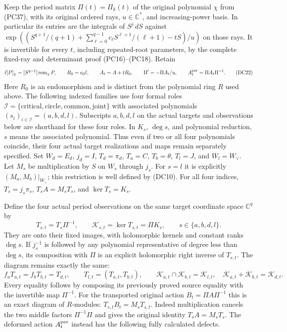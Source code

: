 \documentclass{article}
\begin{document}
Keep the period matrix $\Pi(t)=\Pi_k(t)$ of the original polynomial
$\chi$ from (PC37), with its original ordered rays, $u\in\mathbb C^*$,
and increasing-power basis.  In particular its entries are the
integrals of $S^j\,dS$ against
$\exp((S^{q+1}/(q+1)+\sum_{\ell=0}^{q-1}c_\ell
S^{\ell+1}/(\ell+1)-tS)/u)$ on those rays.  It is invertible for
every $t$, including repeated-root parameters, by the complete
fixed-ray and determinant proof (PC16)--(PC18).  Retain
\[
 \ell[P]_\chi=[S^{q-1}]\operatorname{rem}_\chi P,\qquad
 R_0=e_0\ell,\qquad
 A_t=A+tR_0,\qquad
 \Pi'=-\Pi A_t/u,\qquad
 A_t^{\rm per}=\Pi A_t\Pi^{-1}.
 \tag{DC22}
\]
Here $R_0$ is an endomorphism and is distinct from the polynomial
ring $R$ used above.
The following indexed families use four formal roles
$\mathcal I=\{\mathrm{critical},\mathrm{circle},
\mathrm{common},\mathrm{joint}\}$ with associated polynomials
$(s_i)_{i\in\mathcal I}=(a,b,d,l)$.
Subscripts $a,b,d,l$ on the actual targets and observations below
are shorthand for these four roles.  In $K_s$, $\deg s$,
and polynomial reduction, $s$ means the associated polynomial.
Thus even if two or all four polynomials coincide, their four
actual target realizations and maps remain separately specified.
Set $W_d=E_d$, $j_d=I$, $T_d=\pi_d$, $T_a=C$,
$T_b=\theta$, $T_l=J$, and $W_l=W_\vee$.
Let $M_s$ be multiplication by $S$ on $W_s$ through $j_s$.
For $s=l$ it is explicitly $(M_a,M_b)|_{W_\vee}$; this
restriction is well defined by (DC10).  For all four indices,
$T_s=j_s\pi_s$, $T_sA=M_sT_s$, and $\ker T_s=K_s$.

Define the four actual period observations on the same target
coordinate space $\mathbb C^q$ by
\[
 T_{s,t}=T_s\Pi^{-1},\qquad
 \mathcal K_{s,t}=\ker T_{s,t}=\Pi K_s,
 \qquad s\in\{a,b,d,l\}.
 \tag{DC23}
\]
They are onto their fixed images, with holomorphic kernels and
constant ranks $\deg s$.  If $j_s^{-1}$ is followed by any
polynomial representative of degree less than $\deg s$, its
composition with $\Pi$ is an explicit holomorphic right inverse
of $T_{s,t}$.  The diagram remains exactly the same:
\[
 f_aT_{a,t}=f_bT_{b,t}=T_{d,t},\qquad
 T_{l,t}=(T_{a,t},T_{b,t}),\qquad
 \mathcal K_{a,t}\cap\mathcal K_{b,t}=\mathcal K_{l,t},\quad
 \mathcal K_{a,t}+\mathcal K_{b,t}=\mathcal K_{d,t}.
 \tag{DC24}
\]
Every equality follows by composing its previously proved source
equality with the invertible map $\Pi^{-1}$.
For the transported original action
$B_t=\Pi A\Pi^{-1}$ this is an exact diagram of $R$-modules:
$T_{s,t}B_t=M_sT_{s,t}$.  Indeed multiplication cancels the two
middle factors $\Pi^{-1}\Pi$ and gives the original identity
$T_sA=M_sT_s$.  The deformed action $A_t^{\rm per}$ instead has
the following fully calculated defects.
\end{document}
